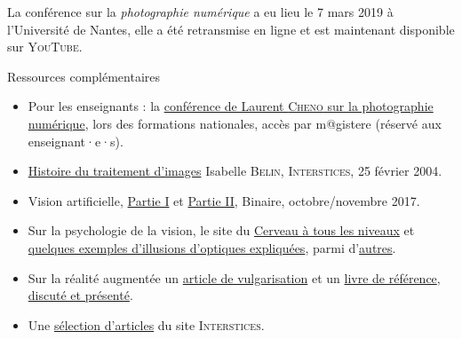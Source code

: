 La conférence sur la \textit{photographie numérique} a eu lieu le 7 mars 2019 à l’Université de Nantes, elle a été retransmise en ligne et est maintenant disponible sur \textsc{YouTube}.

\begin{gofurther}{Ressources complémentaires}
\begin{itemize}\jazzitem
\item Pour les enseignants : la \href{https://magistere.education.fr/dgesco/}{conférence de Laurent \textsc{Cheno} sur la photographie numérique}, lors des formations nationales, accès par m@gistere (réservé aux enseignant·e·s).
\item \href{https://interstices.info/histoire-du-traitement-dimages/}{Histoire du traitement d'images} Isabelle \textsc{Belin}, \textsc{Interstices}, 25 février 2004.
\item Vision artificielle, \href{https://www.lemonde.fr/blog/binaire/2017/10/13/plus-de-50-ans-de-recherches-en-vision-artificielle/}{Partie I} et \href{https://www.lemonde.fr/blog/binaire/2017/11/03/vision-artificielle-saison-2-reconnaitre-un-objet-specifique/}{Partie II}, Binaire, octobre/novembre 2017.
\item Sur la psychologie de la vision, le site du \href{https://lecerveau.mcgill.ca/flash/d/d_02/d_02_cr/d_02_cr_vis/d_02_cr_vis.html}{Cerveau à tous les niveaux} et \href{http://jeux-et-mathematiques.davalan.org/jeux/illusions/}{quelques exemples d'illusions d'optiques expliquées}, parmi d'\href{http://tpeesperance2010.e-monsite.com/pages/iii-les-illusions-d-optique.html}{autres}.
\item Sur la réalité augmentée un \href{https://interstices.info/realite-augmentee-entre-mythes-et-realites/}{article de vulgarisation} et un \href{https://www.istegroup.com/fr/produit/realite-virtuelle-et-realite-augmentee/}{livre de référence}, \href{https://www.lemonde.fr/blog/binaire/2018/12/21/rendez-vous-dans-10-ans/}{discuté et présenté}.
\item Une \href{https://interstices.info/dossier/snt-photographie-numerique/}{sélection d'articles} du site \textsc{Interstices}.
\end{itemize}


\end{gofurther}

